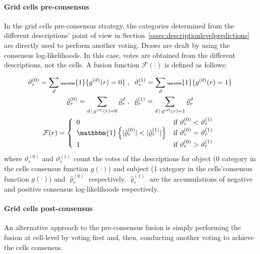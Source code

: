 \documentclass[10pt,twocolumn,letterpaper]{article}
\begin{document}
\paragraph{Grid cells pre-consensus}

In the grid cells pre-consensus strategy, the categories determined from the different descriptions' point of view in Section~\ref{sssec:descriptionlevelpredictions} are directly used to perform another voting. Draws are dealt by using the consensus log-likelihoods. In this case, votes are obtained from the different descriptions, not the cells. A fusion function $\mathcal{F}(\cdot)$ is defined as follows:

\begin{gather*}\tiny
\vartheta_r^{(0)} = \sum_{d} \mathbbm{1}\{ g^{(d)}(r) = 0 \} \; , \;\; \vartheta_r^{(1)} = \sum_{d} \mathbbm{1}\{ g^{(d)}(r) = 1 \} \\
\hat{\varrho}_r^{(0)} = \sum_{d \,|\, g^{(d)}(r) = 0} \hat{\varrho}_r^d \; , \;\; \hat{\varrho}_r^{(1)}  =\sum_{d \,|\, g^{(d)}(r) = 1} \hat{\varrho}_r^d \\
\mathcal{F}(r) =
\left\{
	\begin{array}{ll}
		0  &  \mbox{if } \vartheta_r^{(0)} < \vartheta_r^{(1)}   \\
		\mathbbm{1}\left\{ | \hat{\varrho}_r^{(0)} | < | \hat{\varrho}_r^{(1)} | \right\} &  \mbox{if } \vartheta_r^{(0)} = \vartheta_r^{(1)}   \\
		1 &  \mbox{if } \vartheta_r^{(0)} > \vartheta_r^{(1)}   \\
	\end{array}
\right.
\end{gather*}
where $\vartheta_r^{(0)}$ and $\vartheta_r^{(1)}$ count the votes of the descriptions for object (0 category in the cells consensus function $g(\cdot)$) and subject (1 category in the cells'consensus function $g(\cdot)$) and $\hat{\varrho}_r^{(0)}$ respectively. $\hat{\varrho}_r^{(1)}$ are the accumulations of negative and positive consensus log-likelihoods respectively.

\paragraph{Grid cells post-consensus}

An alternative approach to the pre-consensus fusion is simply performing the fusion at cell-level by voting first and, then, conducting another voting to achieve the cells consensus.
\end{document}
